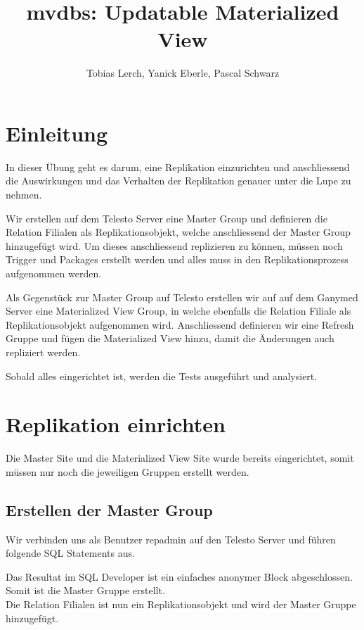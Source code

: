 \documentclass[11pt,a4paper,parskip=half]{scrartcl}
\title{mvdbs: Updatable Materialized View}
\author{Tobias Lerch, Yanick Eberle, Pascal Schwarz}
\begin{document}
\maketitle

\pagestyle{fancy}
\section{Einleitung}
In dieser Übung geht es darum, eine Replikation einzurichten und anschliessend die Auswirkungen und das Verhalten der Replikation genauer unter die Lupe zu nehmen.

Wir erstellen auf dem Telesto Server eine Master Group und definieren die Relation Filialen als Replikationsobjekt, welche anschliessend der Master Group hinzugefügt wird. Um dieses anschliessend replizieren zu können, müssen noch Trigger und Packages erstellt werden und alles muss in den Replikationsprozess aufgenommen werden.

Als Gegenstück zur Master Group auf Telesto erstellen wir auf auf dem Ganymed Server eine Materialized View Group, in welche ebenfalls die Relation Filiale als Replikationsobjekt aufgenommen wird. Anschliessend definieren wir eine Refresh Gruppe und fügen die Materialized View hinzu, damit die Änderungen auch repliziert werden.

Sobald alles eingerichtet ist, werden die Tests ausgeführt und analysiert.

\section{Replikation einrichten}
Die Master Site und die Materialized View Site wurde bereits eingerichtet, somit müssen nur noch die jeweiligen Gruppen erstellt werden.
\subsection{Erstellen der Master Group}
Wir verbinden uns als Benutzer repadmin auf den Telesto Server und führen folgende SQL Statements aus.

 
Das Resultat im SQL Developer ist ein einfaches \glqq{}anonymer Block abgeschlossen\grqq{}. Somit ist die Master Gruppe erstellt.\\


Die Relation Filialen ist nun ein Replikationsobjekt  und wird der Master Gruppe hinzugefügt. \\
\end{document}
